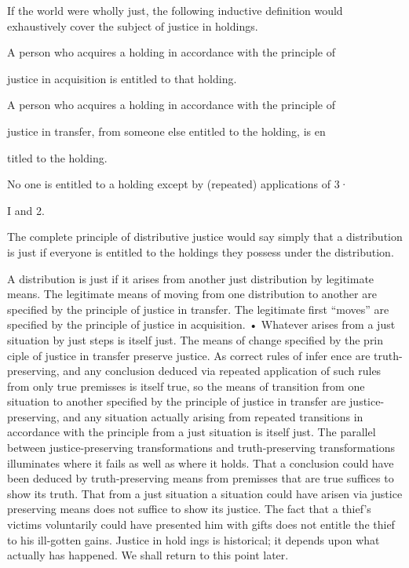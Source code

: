 \documentclass[11pt,openany]{book}
\begin{document}
If the world were wholly just, the following inductive definition would exhaustively cover the subject of justice in holdings. 

A person who acquires a holding in accordance with the principle of 

justice in acquisition is entitled to that holding. 

A person who acquires a holding in accordance with the principle of 

justice in transfer, from someone else entitled to the holding, is en

titled to the holding. 

No one is entitled to a holding except by (repeated) applications of 3· 

I and 2. 

The complete principle of distributive justice would say simply that a distribution is just if everyone is entitled to the holdings they possess under the distribution. 

A distribution is just if it arises from another just distribution by legitimate means. The legitimate means of moving from one distribution to another are specified by the principle of justice in transfer. The legitimate first ``moves'' are specified by the principle of justice in acquisition. • Whatever arises from a just situation by just steps is itself just. The means of change specified by the prin ciple of justice in transfer preserve justice. As correct rules of infer ence are truth-preserving, and any conclusion deduced via repeated application of such rules from only true premisses is itself true, so the means of transition from one situation to another specified by the principle of justice in transfer are justice-preserving, and any situation actually arising from repeated transitions in accordance with the principle from a just situation is itself just. The parallel between justice-preserving transformations and truth-preserving transformations illuminates where it fails as well as where it holds. That a conclusion could have been deduced by truth-preserving means from premisses that are true suffices to show its truth. That from a just situation a situation could have arisen via justice preserving means does not suffice to show its justice. The fact that a thief's victims voluntarily could have presented him with gifts does not entitle the thief to his ill-gotten gains. Justice in hold ings is historical; it depends upon what actually has happened. We shall return to this point later. 
\end{document}
